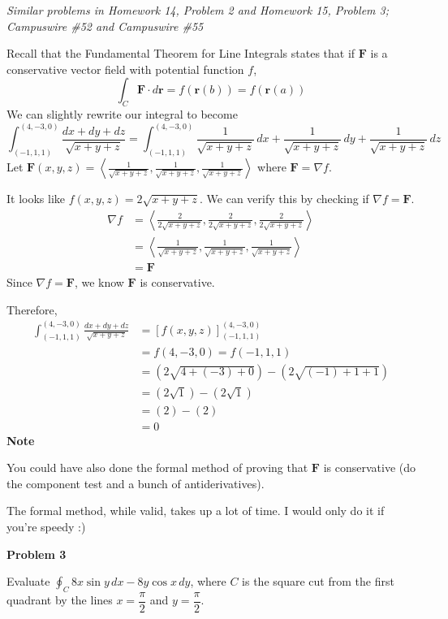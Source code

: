 \documentclass{article}
\newcommand{\lrp}[1]{\left( #1 \right)}
\newcommand{\lra}[1]{\left\langle #1 \right\rangle}
\newcommand{\lrb}[1]{\left[ #1 \right]}
\renewcommand{\r}[0]{\mathbf{r}}
\newcommand{\F}[0]{\mathbf{F}}
\begin{document}
\textit{Similar problems in Homework 14, Problem 2 and Homework 15, Problem 3; Campuswire \#52 and Campuswire \#55}

Recall that the Fundamental Theorem for Line Integrals states that if $\F$ is a conservative vector field with potential function $f$,
\begin{equation*}
    \int_{C}\F\cdot d\r=f\lrp{\r(b)}=f\lrp{\r(a)}
\end{equation*}
We can slightly rewrite our integral to become
\begin{equation*}
    \int_{(-1,1,1)}^{(4,-3,0)}\frac{dx+dy+dz}{\sqrt{x+y+z}}=\int_{(-1,1,1)}^{(4,-3,0)}\frac{1}{\sqrt{x+y+z}}\,dx+\frac{1}{\sqrt{x+y+z}}\,dy+\frac{1}{\sqrt{x+y+z}}\,dz
\end{equation*}
Let $\F(x,y,z)=\lra{\frac{1}{\sqrt{x+y+z}},\frac{1}{\sqrt{x+y+z}},\frac{1}{\sqrt{x+y+z}}}$ where $\F=\nabla f$.

It looks like $f(x,y,z)=2\sqrt{x+y+z}$. We can verify this by checking if $\nabla f = \F$.
\begin{align*}
    \nabla f &= \lra{\frac{2}{2\sqrt{x+y+z}},\frac{2}{2\sqrt{x+y+z}},\frac{2}{2\sqrt{x+y+z}}}\\
    &=\lra{\frac{1}{\sqrt{x+y+z}},\frac{1}{\sqrt{x+y+z}},\frac{1}{\sqrt{x+y+z}}}\\
    &=\F
\end{align*}
Since $\nabla f= \F$, we know $\F$ is conservative.

Therefore,
\begin{align*}
    \int_{(-1,1,1)}^{(4,-3,0)}\frac{dx+dy+dz}{\sqrt{x+y+z}}&=\lrb{f(x,y,z)}_{(-1,1,1)}^{(4,-3,0)}\\
    &=f(4,-3,0)=f(-1,1,1)\\
    &=\lrp{2\sqrt{4+(-3)+0}}-\lrp{2\sqrt{(-1)+1+1}}\\
    &=\lrp{2\sqrt{1}}-\lrp{2\sqrt{1}}\\
    &=\lrp{2}-\lrp{2}\\
    &=\boxed{0}
\end{align*}
\textbf{Note}

You could have also done the formal method of proving that $\F$ is conservative (do the component test and a bunch of antiderivatives).

The formal method, while valid, takes up a lot of time. I would only do it if you're speedy :)

{}\textbf{Problem 3}

Evaluate $\displaystyle \oint_C 8x\sin y\,dx-8y\cos x\,dy$, where $C$ is the square cut from the first quadrant by the lines $x=\dfrac{\pi}{2}$ and $y=\dfrac{\pi}{2}$.
\end{document}
